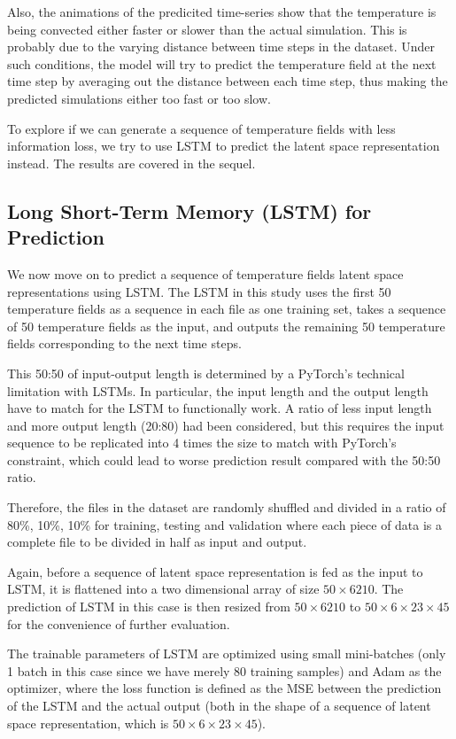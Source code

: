 Also, the animations of the predicited time-series show that the temperature is being convected either faster or slower than the actual simulation. This is probably due to the varying distance between time steps in the dataset. Under such conditions, the model will try to predict the temperature field at the next time step by averaging out the distance between each time step, thus making the predicted simulations either too fast or too slow.

To explore if we can generate a sequence of temperature fields with less information loss, we try to use LSTM to predict the latent space representation instead. The results are covered in the sequel.


\subsection{Long Short-Term Memory (LSTM) for Prediction}

We now move on to predict a sequence of temperature fields latent space representations using LSTM. The LSTM in this study uses the first 50 temperature fields as a sequence in each file as one training set, takes a sequence of 50 temperature fields as the input, and outputs the remaining 50 temperature fields corresponding to the next time steps.

This 50:50 of input-output length is determined by a PyTorch's technical limitation with LSTMs. In particular, the input length and the output length have to match for the LSTM to functionally work. A ratio of less input length and more output length (20:80) had been considered, but this requires the input sequence to be replicated into 4 times the size to match with PyTorch's constraint, which could lead to worse prediction result compared with the 50:50 ratio.

Therefore, the files in the dataset are randomly shuffled and divided in a ratio of 80\%, 10\%, 10\% for training, testing and validation where each piece of data is a complete file to be divided in half as input and output.

Again, before a sequence of latent space representation is fed as the input to LSTM, it is flattened into a two dimensional array of size $50 \times 6210$. The prediction of LSTM in this case is then resized from $50 \times 6210$ to $50 \times 6 \times 23 \times 45$ for the convenience of further evaluation.

The trainable parameters of LSTM are optimized using small mini-batches (only 1 batch in this case since we have merely 80 training samples) and Adam as the optimizer, where the loss function is defined as the MSE between the prediction of the LSTM and the actual output (both in the shape of a sequence of latent space representation, which is $50 \times 6 \times 23 \times 45$).

